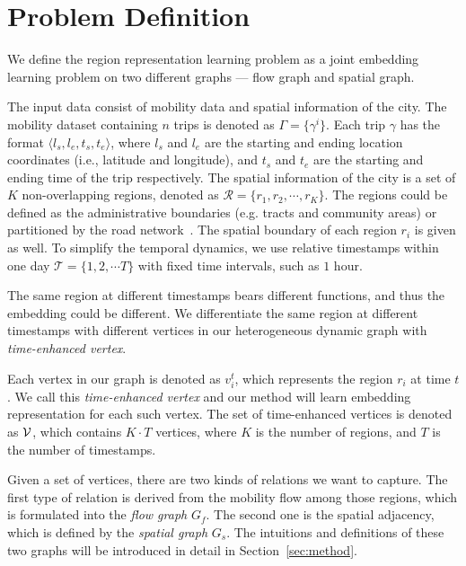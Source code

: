 \section{Problem Definition}
\label{sec:definition}


We define the region representation learning problem as a joint embedding learning problem on two different graphs --- flow graph and spatial graph.


The input data consist of mobility  data and spatial information of the city. The mobility dataset containing $n$ trips is denoted as $\Gamma = \{ \gamma^i \}$. Each trip $\gamma$ has the format $\langle l_s, l_e, t_s, t_e \rangle$, where $l_s$ and $l_e$ are the starting and ending location coordinates (i.e., latitude and longitude), and $t_s$ and $t_e$ are the starting and ending time of the trip respectively. The spatial information of the city is a set of $K$ non-overlapping regions, denoted as $\mathcal{R} = \{ r_1, r_2, \cdots, r_K \}$. The regions could be defined as the administrative boundaries (e.g. tracts and community areas) or partitioned by the road network~\cite{yuan2012discovering}. The spatial boundary of each region $r_i$ is given as well. To simplify the temporal dynamics, we use relative timestamps within one day $\mathcal{T} = \{ 1, 2, \cdots T\}$ with fixed time intervals, such as $1$ hour.


The same region at different timestamps bears different functions, and thus the embedding could be different. We differentiate the same region at different timestamps with different vertices in our heterogeneous dynamic graph with \emph{time-enhanced vertex}. 


\begin{definition}
Each vertex in our graph is denoted as $v_i^t$, which represents the region $r_i$ at time $t$. We call this \emph{time-enhanced vertex} and our method will learn embedding representation for each such vertex. The set of time-enhanced vertices is denoted as $\mathcal{V}$, which contains $K \cdot T$ vertices, where $K$ is the number of regions, and $T$ is the number of timestamps.
\end{definition}


Given a set of vertices, there are two kinds of relations we want to capture. The first type of relation is derived from the mobility flow among those regions, which is formulated into the \emph{flow graph} $G_f$. The second one is the spatial adjacency, which is defined by the \emph{spatial graph} $G_s$. The intuitions and definitions of these two graphs will be introduced in detail in Section~\ref{sec:method}.



